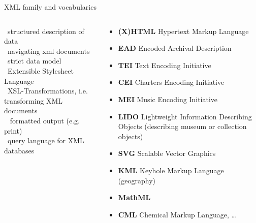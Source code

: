 \begin{frame}{XML family and vocabularies}
\begin{columns}
\footnotesize
{}~structured description of data \\
~navigating xml documents \\
~strict data model \\
~Extensible Stylesheet Language  \\
~XSL-Transformations, i.e. transforming XML documents  \\
~ formatted output (e.g. print) \\
~query language for XML databases \\
~
\begin{block}{}
\footnotesize
\begin{itemize}
    \item \textbf{(X)HTML} Hypertext Markup Language 
    \item \textbf{EAD} Encoded Archival Description 
    \item \textbf{TEI} Text Encoding Initiative 
    \item \textbf{CEI} Charters Encoding Initiative 
    \item \textbf{MEI} Music Encoding Initiative 
    \item \textbf{LIDO} Lightweight Information Describing Objects (describing museum or collection objects)
    \item \textbf{SVG} Scalable Vector Graphics 
    \item \textbf{KML} Keyhole Markup Language (geography)
    \item \textbf{MathML} 
    \item \textbf{CML} Chemical Markup Language, \dots
\end{itemize}
\end{block}
\end{columns}


\end{frame}




